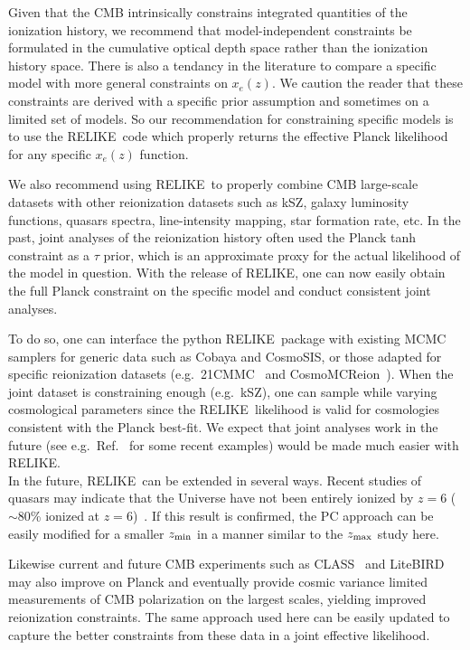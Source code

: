 \documentclass[aps,prd,twocolumn,amsmath,amssymb,showpacs,floatfix,superscriptaddress,nofootinbib]{revtex4-1}
\newcommand{\zmax}{z_{\rm max}}
\newcommand{\zmin}{z_{\rm min}}
\newcommand{\relike}{RELIKE}
\begin{document}
{Given that the CMB intrinsically constrains integrated quantities of the ionization history, we recommend that model-independent constraints be formulated in the cumulative optical depth space rather than the ionization history space. There is also a tendancy in the literature to compare a specific model with more general constraints on $x_e(z)$. We caution the reader that these constraints are derived with a specific prior assumption and sometimes on a limited set of models. So our recommendation for constraining specific models is to use the \relike\  code which properly returns the effective Planck likelihood for any specific $x_e(z)$ function.

We also recommend using \relike\  to properly combine CMB large-scale datasets with other reionization datasets such as kSZ, galaxy luminosity functions, quasars spectra, line-intensity mapping, star formation rate, etc. In the past, joint analyses of the reionization history often used the Planck tanh constraint as a $\tau$ prior, which is an approximate proxy for the actual likelihood of the model in question. With the release of \relike, one can now easily obtain the full Planck constraint on the specific model and conduct consistent joint analyses. 

To do so, one can interface the python \relike\  package with existing MCMC samplers for generic data such as Cobaya and CosmoSIS, or those adapted for specific reionization datasets (e.g.\ 21CMMC~\cite{Greig:2015qca} and CosmoMCReion~\cite{Chatterjee:2021ygm}). When the joint dataset is constraining enough (e.g.\ kSZ), one can sample while varying cosmological parameters since the \relike\  likelihood is valid for cosmologies consistent with the Planck best-fit. We expect that joint analyses work in the future (see e.g.\ Ref.~\cite{Ahn:2020btj, Qin:2020xrg} for some recent examples) would be made much easier with \relike. \\

In the future, \relike\ can be extended in several ways.
Recent studies of quasars may indicate that the Universe have not been entirely ionized by $z = 6$ ($\sim$80\% ionized at $z = 6$)~\cite{Becker:2021jyx}. If this result is confirmed,
the PC approach can be easily modified for a smaller $\zmin$ in a manner similar to the $\zmax$ study here. 

Likewise current and future CMB experiments such as CLASS~\cite{Watts:2018etg} and LiteBIRD~\cite{Hazumi:2021yqq} may also improve on Planck and eventually provide cosmic variance limited measurements of CMB polarization on the largest scales, yielding improved reionization constraints. The same approach used here can be easily updated to capture the better constraints from these data in a joint effective likelihood. \\

}
\end{document}
